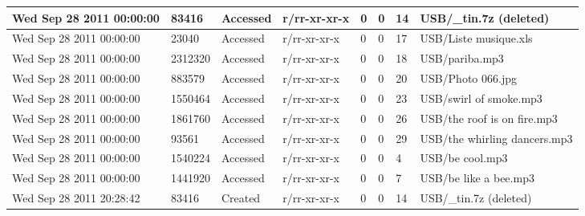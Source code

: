 \begin{longtable}[c]{|p{0.121\DUtablewidth}|p{0.1\DUtablewidth}|p{0.08\DUtablewidth}|p{0.12\DUtablewidth}|p{0.06\DUtablewidth}|p{0.06\DUtablewidth}|p{0.06\DUtablewidth}|p{0.2\DUtablewidth}|}
Wed Sep 28 2011 00:00:00
 & 
83416
 & 
Accessed
 & 
r/rr-xr-xr-x
 & 
0
 & 
0
 & 
14
 & 
USB/\_tin.7z (deleted)
 \\
\hline

Wed Sep 28 2011 00:00:00
 & 
23040
 & 
Accessed
 & 
r/rr-xr-xr-x
 & 
0
 & 
0
 & 
17
 & 
USB/Liste musique.xls
 \\
\hline

Wed Sep 28 2011 00:00:00
 & 
2312320
 & 
Accessed
 & 
r/rr-xr-xr-x
 & 
0
 & 
0
 & 
18
 & 
USB/pariba.mp3
 \\
\hline

Wed Sep 28 2011 00:00:00
 & 
883579
 & 
Accessed
 & 
r/rr-xr-xr-x
 & 
0
 & 
0
 & 
20
 & 
USB/Photo 066.jpg
 \\
\hline

Wed Sep 28 2011 00:00:00
 & 
1550464
 & 
Accessed
 & 
r/rr-xr-xr-x
 & 
0
 & 
0
 & 
23
 & 
USB/swirl of smoke.mp3
 \\
\hline

Wed Sep 28 2011 00:00:00
 & 
1861760
 & 
Accessed
 & 
r/rr-xr-xr-x
 & 
0
 & 
0
 & 
26
 & 
USB/the roof is on fire.mp3
 \\
\hline

Wed Sep 28 2011 00:00:00
 & 
93561
 & 
Accessed
 & 
r/rr-xr-xr-x
 & 
0
 & 
0
 & 
29
 & 
USB/the whirling dancers.mp3
 \\
\hline

Wed Sep 28 2011 00:00:00
 & 
1540224
 & 
Accessed
 & 
r/rr-xr-xr-x
 & 
0
 & 
0
 & 
4
 & 
USB/be cool.mp3
 \\
\hline

Wed Sep 28 2011 00:00:00
 & 
1441920
 & 
Accessed
 & 
r/rr-xr-xr-x
 & 
0
 & 
0
 & 
7
 & 
USB/be like a bee.mp3
 \\
\hline

Wed Sep 28 2011 20:28:42
 & 
83416
 & 
Created
 & 
r/rr-xr-xr-x
 & 
0
 & 
0
 & 
14
 & 
USB/\_tin.7z (deleted)
 \\
\hline
\end{longtable}
